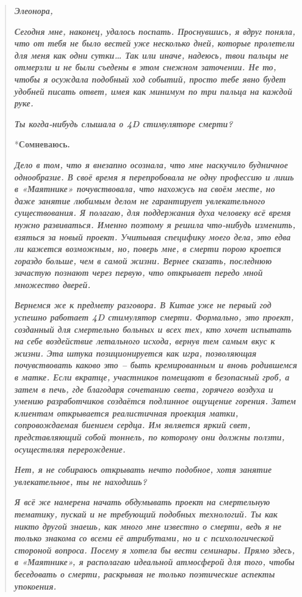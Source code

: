 \documentclass[
  a5paperpaper,
  DIV=11,
  numbers=noendperiod]{scrreprt}
\begin{document}
\begin{quote}
\textbf{\emph{Элеонора,}}

\textbf{\emph{Сегодня мне, наконец, удалось поспать. Проснувшись, я
вдруг поняла, что от тебя не было вестей уже несколько дней, которые
пролетели для меня как одни сутки\ldots{} Так или иначе, надеюсь, твои
пальцы не отмерзли и не были съедены в этом снежном заточении. Не то,
чтобы я осуждала подобный ход событий, просто тебе явно будет удобней
писать ответ, имея как минимум по три пальца на каждой руке.}}

\textbf{\emph{Ты когда-нибудь слышала о 4D стимуляторе смерти?}}

*\textbf{Сомневаюсь.}

\textbf{\emph{Дело в том, что я внезапно осознала, что мне наскучило
будничное однообразие. В своё время я перепробовала не одну профессию и
лишь в «Маятнике» почувствовала, что нахожусь на своём месте, но даже
занятие любимым делом не гарантирует увлекательного существования. Я
полагаю, для поддержания духа человеку всё время нужно развиваться.
Именно поэтому я решила что-нибудь изменить, взяться за новый проект.
Учитывая специфику моего дела, это едва ли кажется возможным, но, поверь
мне, в смерти порою кроется гораздо больше, чем в самой жизни. Вернее
сказать, последнюю зачастую познают через первую, что открывает передо
мной множество дверей.}}

\textbf{\emph{Вернемся же к предмету разговора. В Китае уже не первый
год успешно работает 4D стимулятор смерти. Формально, это проект,
созданный для смертельно больных и всех тех, кто хочет испытать на себе
воздействие летального исхода, вернув тем самым вкус к жизни. Эта штука
позиционируется как игра, позволяющая почувствовать каково это -- быть
кремированным и вновь родившемся в матке. Если вкратце, участников
помещают в безопасный гроб, а затем в печь, где благодаря сочетанию
света, горячего воздуха и умению разработчиков создаётся подлинное
ощущение горения. Затем клиентам открывается реалистичная проекция
матки, сопровождаемая биением сердца. Им является яркий свет,
представляющий собой тоннель, по которому они должны ползти, осуществляя
перерождение.}}

\textbf{\emph{Нет, я не собираюсь открывать нечто подобное, хотя занятие
увлекательное, ты не находишь?}}

\textbf{\emph{Я всё же намерена начать обдумывать проект на смертельную
тематику, пускай и не требующий подобных технологий. Ты как никто другой
знаешь, как много мне известно о смерти, ведь я не только знакома со
всеми её атрибутами, но и с психологической стороной вопроса. Посему я
хотела бы вести семинары. Прямо здесь, в «Маятнике», я располагаю
идеальной атмосферой для того, чтобы беседовать о смерти, раскрывая не
только поэтические аспекты упокоения.}}


\end{quote}
\end{document}
